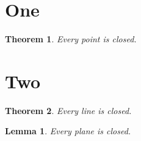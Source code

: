 \documentclass{article}
\newtheorem{theorem}{Theorem}
\newtheorem{step}{Lemma}
\begin{document}
\section{One}
\begin{theorem} Every point is closed. \end{theorem}
\section{Two}
\begin{theorem} Every line is closed. \end{theorem}
\begin{step} Every plane is closed. \end{step}
\end{document}
